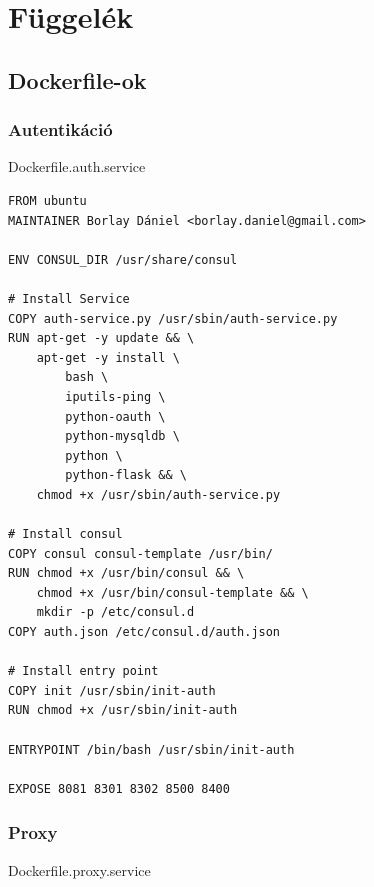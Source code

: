\documentclass[11pt,magyar,a4paper,twoside,]{report}
\begin{document}
\listoffigures




\appendix

\chapter{Függelék}\label{fuxfcggeluxe9k}

\section{\texorpdfstring{Dockerfile-ok\label{appendix-dockerfile}}{Dockerfile-ok}}\label{dockerfile-ok}

\subsection{Autentikáció}\label{autentikuxe1ciuxf3}

Dockerfile.auth.service

\begin{verbatim}
FROM ubuntu
MAINTAINER Borlay Dániel <borlay.daniel@gmail.com>

ENV CONSUL_DIR /usr/share/consul

# Install Service
COPY auth-service.py /usr/sbin/auth-service.py
RUN apt-get -y update && \
    apt-get -y install \
        bash \
        iputils-ping \
        python-oauth \
        python-mysqldb \
        python \
        python-flask && \
    chmod +x /usr/sbin/auth-service.py

# Install consul
COPY consul consul-template /usr/bin/
RUN chmod +x /usr/bin/consul && \
    chmod +x /usr/bin/consul-template && \
    mkdir -p /etc/consul.d
COPY auth.json /etc/consul.d/auth.json

# Install entry point
COPY init /usr/sbin/init-auth
RUN chmod +x /usr/sbin/init-auth

ENTRYPOINT /bin/bash /usr/sbin/init-auth

EXPOSE 8081 8301 8302 8500 8400
\end{verbatim}

\subsection{Proxy}\label{proxy}

Dockerfile.proxy.service
\end{document}
